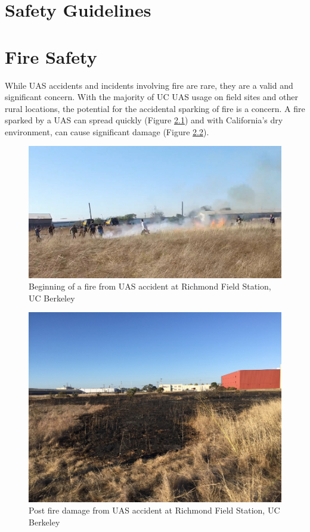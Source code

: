 \documentclass[
]{book}
\begin{document}
\hypertarget{ch-safety-guidelines}{%
\chapter{Safety Guidelines}\label{ch-safety-guidelines}}

\hypertarget{ch-fire-safety}{%
\chapter{Fire Safety}\label{ch-fire-safety}}

While UAS accidents and incidents involving fire are rare, they are a valid and significant concern. With the majority of UC UAS usage on field sites and other rural locations, the potential for the accidental sparking of fire is a concern. A fire sparked by a UAS can spread quickly (Figure \ref{fig:fire-start}) and with California's dry environment, can cause significant damage (Figure \ref{fig:fire-damage}).

\begin{figure}

{\centering \includegraphics[width=0.75\linewidth]{images/fire_start} 

}

\caption{Beginning of a fire from UAS accident at Richmond Field Station, UC Berkeley}\label{fig:fire-start}
\end{figure}

\begin{figure}

{\centering \includegraphics[width=0.75\linewidth]{images/fire_damage} 

}

\caption{Post fire damage from UAS accident at Richmond Field Station, UC Berkeley}\label{fig:fire-damage}
\end{figure}
\end{document}
